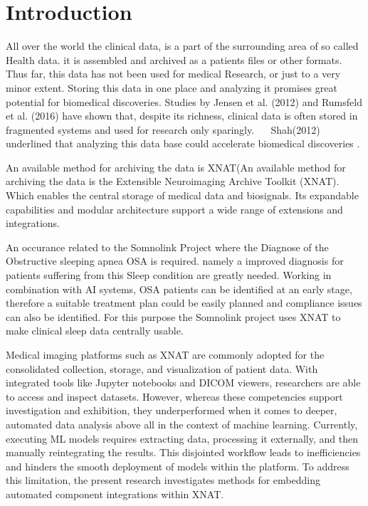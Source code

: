 \chapter{Introduction}
\begin{comment}
...
\end{comment}

 All over the world the clinical data, is a part of the surrounding area of so called Health data. it is assembled and archived as a patients files or other formats. Thus far, this data has not been used for medical Research, or just to a very minor extent. Storing this data in one place and analyzing it promises great potential for biomedical discoveries. Studies by Jensen et al. (2012) and Rumsfeld et al. (2016) have shown that, despite its richness, clinical data is often stored in fragmented systems and used for research only sparingly.~\cite{jensen_mining_2012} ~\cite{rumsfeld_big_2016} Shah(2012) underlined that analyzing this data base could accelerate biomedical discoveries \cite{shah_coming_2012}.


An available method for archiving the data is XNAT(An available method for archiving the data is the Extensible Neuroimaging Archive Toolkit (XNAT). ~\cite{marcus_extensible_2007} Which enables the central storage of medical data and biosignals. Its expandable capabilities and modular architecture support a wide range of extensions and integrations. 


An occurance related to the Somnolink Project where the Diagnose of the Obstructive sleeping apnea \ac{OSA} is required. namely a improved diagnosis for patients suffering from this Sleep condition are greatly needed. Working in combination with \ac{AI} systems, OSA patients can be identified at an early stage, therefore a suitable treatment plan could be easily planned and compliance issues can also be identified. For this purpose the Somnolink project uses XNAT to make clinical sleep data centrally usable.~\cite{internetredaktion_somnolink_nodate}   


Medical imaging platforms such as XNAT are commonly adopted for the consolidated collection, storage, and visualization of patient data. With integrated tools like Jupyter notebooks and \ac{DICOM} viewers, researchers are able to access and inspect datasets. However, whereas these competencies support investigation and exhibition, they underperformed when it comes to deeper, automated data analysis above all in the context of machine learning. Currently, executing ML models requires extracting data, processing it externally, and then manually reintegrating the results. This disjointed workflow leads to inefficiencies and hinders the smooth deployment of models within the platform. To address this limitation, the present research investigates methods for embedding automated component integrations within XNAT.


